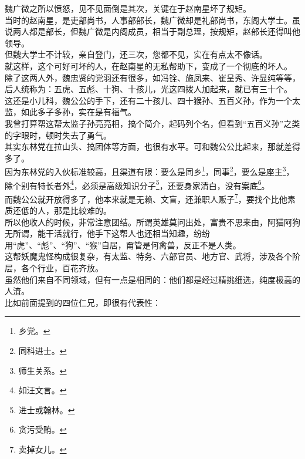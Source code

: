 \begin{multicols}{\theparacolNo}
魏广微之所以愤怒，见不见面倒是其次，关键在于赵南星坏了规矩。\\

当时的赵南星，是吏部尚书，人事部部长，魏广微却是礼部尚书，东阁大学士。虽说两人都是部长，但魏广微是内阁成员，相当于副总理，按规矩，赵部长还得叫他领导。\\

但魏大学士不计较，亲自登门，还三次，您都不见，实在有点太不像话。\\

就这样，这个可好可坏的人，在赵南星的无私帮助下，变成了一个彻底的坏人。\\

除了这两人外，魏忠贤的党羽还有很多，如冯铨、施凤来、崔呈秀、许显纯等等，后人统称为：五虎、五彪、十狗、十孩儿，光这四拨人加起来，就已有三十个。\\

这还是小儿科，魏公公的手下，还有二十孩儿、四十猴孙、五百义孙，作为一个太监，如此多子多孙，实在是有福气。\\

我曾打算帮这帮太监子孙亮亮相，搞个简介，起码列个名，但看到“五百义孙”之类的字眼时，顿时失去了勇气。\\

其实东林党在拉山头、搞团体等方面，也很有水平。可和魏公公比起来，那就差得多了。\\

因为东林党的入伙标准较高，且渠道有限：要么是同乡\footnote{乡党。}，同事\footnote{同科进士。}，要么是座主\footnote{师生关系。}，除个别有特长者外\footnote{如汪文言。}，必须是高级知识分子\footnote{进士或翰林。}，还要身家清白，没有案底\footnote{贪污受贿。}。\\

而魏公公就开放得多了，他本来就是无赖、文盲，还兼职人贩子\footnote{卖掉女儿。}，要找个比他素质还低的人，那是比较难的。\\

所以他收人的时候，非常注意团结。所谓英雄莫问出处，富贵不思来由，阿猫阿狗无所谓，能干活就行，他手下这帮人也还相当知趣，纷纷用“虎”、“彪”、“狗”、“猴”自居，甭管是何禽兽，反正不是人类。\\

这帮妖魔鬼怪构成很复杂，有太监、特务、六部官员、地方官、武将，涉及各个阶层，各个行业，百花齐放。\\

虽然他们来自不同领域，但有一点是相同的：他们都是经过精挑细选，纯度极高的人渣。\\

比如前面提到的四位仁兄，即很有代表性：\\


\end{multicols}
